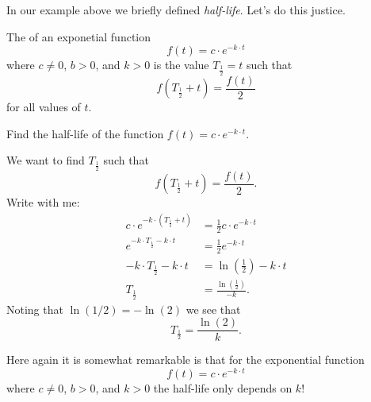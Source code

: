 \documentclass{ximera}
\begin{document}
In our example above we briefly defined \textit{half-life}. Let's do
this justice.

\begin{definition}
  The  of an exponetial function
  \[
  f(t) = c\cdot e^{-k\cdot t}
  \]
  where $c\ne 0$, $b>0$, and $k>0$ is the value $T_{\frac{1}{2}} =t$ such that
  \[
  f(T_{\frac{1}{2}}+t) =  \frac{f(t)}{2}
  \]
  for all values of $t$.
\end{definition}

\begin{example}
  Find the half-life of the function $f(t) = c\cdot e^{-k\cdot t}$.
  \begin{explanation}
    We want to find $T_{\frac{1}{2}}$ such that
    \[
    f(T_{\frac{1}{2}}+t) = \frac{f(t)}{2}.
    \]
    Write with me:
    \begin{align*}
    c\cdot e^{-k\cdot (T_{\frac{1}{2}}+t)} &= \frac{1}{2} c\cdot e^{-k\cdot t}\\
    e^{-k\cdot T_{\frac{1}{2}}-k\cdot t} &= \frac{1}{2} e^{-k\cdot t}\\
    -k\cdot T_{\frac{1}{2}}-k\cdot t &= \ln \left(\frac{1}{2}\right) - k\cdot t\\
    T_{\frac{1}{2}} &= \frac{\ln \left(\frac{1}{2}\right)}{-k}.
    \end{align*}
    Noting that $\ln(1/2) = -\ln(2)$ we see that
    \[
    T_{\frac{1}{2}} = \frac{\ln(2)}{k}.
    \]
  \end{explanation}
\end{example}

Here again it is somewhat remarkable is that for the exponential
function
  \[
  f(t) = c\cdot e^{-k\cdot t}
  \]
  where $c\ne 0$, $b>0$, and $k>0$ the half-life only depends on $k$!
\end{document}
